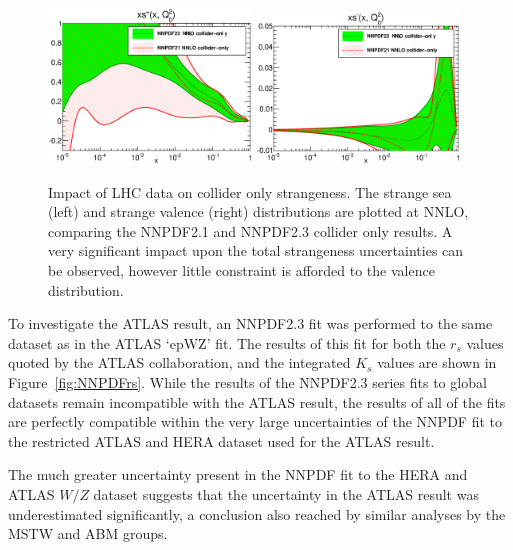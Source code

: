 \begin{figure}[ht]
\centering
\includegraphics[width=0.48\textwidth]{6-LHCimpact/figs/pdf_xsplus_log_band_comparison_coll.eps}
\includegraphics[width=0.48\textwidth]{6-LHCimpact/figs/pdf_xsminus_log_band_comparison_coll.eps}
\caption[Impact of LHC data on collider only strangeness]{Impact of LHC data on collider only strangeness. The strange sea (left) and strange valence (right) distributions are plotted at NNLO, comparing the NNPDF2.1 and NNPDF2.3 collider only results. A very significant impact upon the total strangeness uncertainties can be observed, however little constraint is afforded to the valence distribution.}
\label{fig:21vs23coll_strange}
\end{figure}

To investigate the ATLAS result, an NNPDF2.3 fit was performed to the same dataset as in the ATLAS `epWZ' fit. The results of this fit for both the $r_s$ values quoted by the ATLAS collaboration, and the integrated $K_s$ values are shown in Figure~\ref{fig:NNPDFrs}. While the results of the NNPDF2.3 series fits to global datasets remain incompatible with the ATLAS result, the results of all of the fits are perfectly compatible within the very large uncertainties of the NNPDF fit to the restricted ATLAS and HERA dataset used for the ATLAS result.

The much greater uncertainty present in the NNPDF fit to the HERA and ATLAS $W/Z$ dataset suggests that the uncertainty in the ATLAS result was underestimated significantly, a conclusion also reached by similar analyses by the MSTW and ABM groups\cite{Watt:2012tq,Alekhin:2014sya}.


